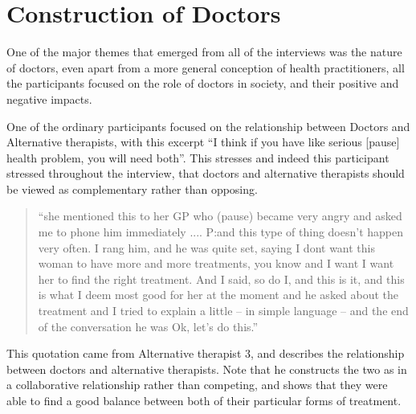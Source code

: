

\section{Construction of Doctors}
\label{sec:construction-doctors}

One of the major themes that emerged from all of the interviews was the nature of doctors, even apart from a more general conception of health practitioners, all the participants focused on the role of doctors in society, and their positive and negative impacts. 

One of the ordinary participants focused on the relationship between Doctors and Alternative therapists, with this excerpt ``I think if you have like serious [pause] health problem, you will need both''. This stresses and indeed this participant stressed throughout the interview, that doctors and alternative therapists should be viewed as complementary rather than opposing. 

\begin{quotation}
  ``she mentioned this to her GP who (pause) became very angry and asked me to phone him immediately 
....
P:and this type of thing doesn't happen very often. I rang him, and he was quite set, saying I dont want this woman to have more and more treatments, you know and I want I want her to find the right treatment. And I said, so do I, and this is it, and this is what I deem most good for her at the moment and he asked about the treatment and I tried to explain a little – in simple language – and the end of the conversation he was Ok, let's do this.'' 

\end{quotation}

This quotation came from Alternative therapist 3, and describes the relationship between doctors and alternative therapists. Note that he constructs the two as in a collaborative relationship rather than competing, and shows that they were able to find a good balance between both of their particular forms of treatment. 

